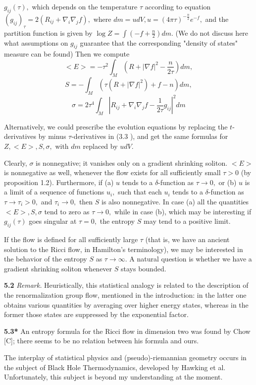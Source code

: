 \documentclass[12pt]{article}
\theoremstyle{plain}
{\swapnumbers
\newtheorem{thm}{Theorem}[section]
\newtheorem{cor}[thm]{Corollary}
\newtheorem{lem}[thm]{Lemma}
\newtheorem{prop}[thm]{Proposition}
}
\theoremstyle{definition}
{\swapnumbers
\newtheorem{defn}[thm]{Definition}
\newtheorem{nota}[thm]{Notation}
\newtheorem{parag}[thm]{}
\newtheorem*{parstr}{\addtocounter{thm}{1}\thesection.\arabic{thm}*}
\newtheorem*{intropar}{\addtocounter{thm}{1}\arabic{thm}}
}
\theoremstyle{remark} {\swapnumbers
\newtheorem{rem}[thm]{Remark}
\newtheorem{exam}[thm]{Example}
\newtheorem{lemma}[thm]{Lemma}
\newtheorem{claim}[thm]{Claim}
}
\numberwithin{equation}{section}
\begin{document}
$g_{ij}(\tau),$ which depends on the temperature $\tau$ according
to equation $(g_{ij})_\tau=2(R_{ij}+\nabla_i\nabla_j f),$ where
$dm=udV, u=(4\pi\tau)^{-\frac{n}{2}}e^{-f},$ and the partition
function is given by $\log Z=\int{(-f+\frac{n}{2})dm}.$ (We do not
discuss here what assumptions on $g_{ij}$ guarantee that the
corresponding "density of states" measure can be found) Then we
compute $$ <E>=-\tau^2\int_M{(R+|\nabla
f|^2-\frac{n}{2\tau})dm},$$
$$S=-\int_M{(\tau(R+|\nabla f|^2)+f-n)dm},$$
$$ \sigma=2\tau^4\int_M{|R_{ij}+\nabla_i\nabla_j
f-\frac{1}{2\tau}g_{ij}|^2dm}$$ \par Alternatively, we could
prescribe the evolution equations by replacing the $t$-derivatives
by minus $\tau$-derivatives in (3.3 ), and get the same formulas
for $Z, <E>, S, \sigma,$ with $dm$ replaced by $udV.$ \par
Clearly, $\sigma$ is nonnegative; it vanishes only on a gradient
shrinking soliton. $<E>$ is nonnegative as well, whenever the flow
exists for all sufficiently small $\tau>0$ (by proposition 1.2).
Furthermore, if (a) $u$ tends to a $\delta$-function as $\tau\to
0,$ or (b) $u$ is a limit of a sequence of functions $u_i,$ such
that each $u_i$ tends to a $\delta$-function as $\tau\to\tau_i>0,$
and $\tau_i\to 0,$ then $S$ is also nonnegative. In case (a) all
the quantities $<E>, S, \sigma$ tend to zero as $\tau\to 0,$ while
in case (b), which may be interesting if $g_{ij}(\tau)$ goes
singular at $\tau=0,$ the entropy $S$ may tend to a positive
limit. \par If the flow is defined for all sufficiently large
$\tau$ (that is, we have an ancient solution to the Ricci flow, in
Hamilton's terminology), we may be interested in the behavior of
the entropy $S$ as $\tau\to\infty.$  A natural question is whether
we have a gradient shrinking soliton whenever $S$ stays bounded.
\par {\bf 5.2} {\it Remark.}  Heuristically, this statistical analogy is related to
the description of the renormalization group flow, mentioned in
the introduction: in the latter one obtains various quantities by
averaging over higher energy states, whereas in the former those
states are  suppressed by the exponential factor.
\par {\bf 5.3*} An entropy formula for the Ricci flow in dimension two
was found by Chow [C]; there seems to be no relation between his
formula and ours.
\par The interplay of statistical physics and (pseudo)-riemannian
geometry occurs in the subject of Black Hole Thermodynamics,
developed by Hawking et al. Unfortunately, this subject is beyond
my understanding at the moment.
\end{document}
